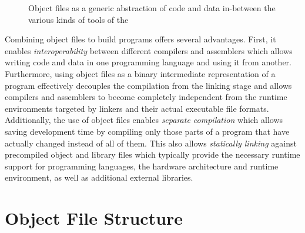 \begin{figure}
\caption[Object files as a generic abstraction of code and data]{Object files as a generic abstraction of code and data in-between the various kinds of tools of the \ecs{}}
\label{fig:objdataflow}
\end{figure}

Combining object files to build programs offers several advantages.
First, it enables \emph{interoperability} between different compilers and assemblers which allows writing code and data in one programming language and using it from another.
Furthermore, using object files as a binary intermediate representation of a program effectively decouples the compilation from the linking stage and allows compilers and assemblers to become completely independent from the runtime environments targeted by linkers and their actual executable file formats.
Additionally, the use of object files enables \emph{separate compilation} which allows saving development time by compiling only those parts of a program that have actually changed instead of all of them.
This also allows \emph{statically linking} against precompiled object and library files which typically provide the necessary runtime support for programming languages, the hardware architecture and runtime environment, as well as additional external libraries.

\section{Object File Structure}

